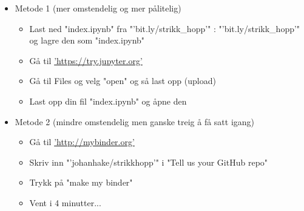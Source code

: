 \documentclass[%
oneside,                 %
final,                   %
10pt,norsk]{article}
\begin{document}
\begin{itemize}
\item Metode 1 (mer omstendelig og mer pålitelig)
\begin{itemize}

 \item Last ned "index.ipynb" fra "'bit.ly/strikk_hopp'" : "'bit.ly/strikk_hopp'" og lagre den som "index.ipynb"

 \item Gå til \href{{https://try.jupyter.org}}{'https://try.jupyter.org'}

 \item Gå til Files og velg "open" og så last opp (upload)

 \item Last opp din fil "index.ipynb" og åpne den
\end{itemize}

\noindent
\end{itemize}

\noindent

\begin{itemize}
\item Metode 2 (mindre omstendelig men ganske treig å få satt igang)
\begin{itemize}

 \item Gå til \href{{http://mybinder.org}}{'http://mybinder.org'}

 \item Skriv inn "'johanhake/strikkhopp'" i "Tell us your GitHub repo"

 \item Trykk på "make my binder"

 \item Vent i 4 minutter...
\end{itemize}

\noindent
\end{itemize}

\noindent



\end{document}
